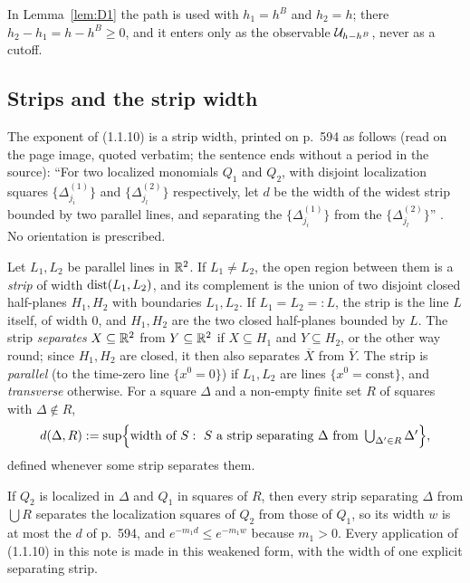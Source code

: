 In Lemma~\ref{lem:D1} the path is used with $h_1=h^B$ and $h_2=h$; there
$h_2-h_1=h-h^B\ge0$, and it enters only as the observable $\mathcal U_{h-h^B}$, never as a cutoff.

\subsection{Strips and the strip width}\label{sec:notation-strips}

The exponent of (1.1.10) is a strip width, printed on p.~594 as follows (read on the page
image, quoted verbatim; the sentence ends without a period in the source): ``For two
localized monomials $Q_1$ and $Q_2$, with disjoint localization squares
$\{\Delta^{(1)}_{j_i}\}$ and $\{\Delta^{(2)}_{j_l}\}$ respectively, let $d$ be the width of
the widest strip bounded by two parallel lines, and separating the $\{\Delta^{(1)}_{j_i}\}$
from the $\{\Delta^{(2)}_{j_l}\}$'' \cite[p.~594]{GJS}.  No orientation is prescribed.

\begin{auxdef}\label{aux:notation-stripdef}
Let $L_1,L_2$ be parallel lines in $\mathbb{R}^2$.  If $L_1\ne L_2$, the open region between them is
a \emph{strip} of width $\operatorname{dist}(L_1,L_2)$, and its complement is the union of two disjoint
closed half-planes $H_1,H_2$ with boundaries $L_1,L_2$.  If $L_1=L_2=:L$, the strip is the
line $L$ itself, of width $0$, and $H_1,H_2$ are the two closed half-planes bounded by $L$.
The strip \emph{separates} $X\subseteq\mathbb{R}^2$ from $Y\subseteq\mathbb{R}^2$ if $X\subseteq H_1$ and
$Y\subseteq H_2$, or the other way round; since $H_1,H_2$ are closed, it then also separates
$\overline X$ from $\overline Y$.  The strip is \emph{parallel} (to the time-zero line
$\{x^0=0\}$) if $L_1,L_2$ are lines $\{x^0=\text{const}\}$, and \emph{transverse}
otherwise.  For a square $\Delta$ and a non-empty finite set $R$ of squares with
$\Delta\notin R$,
\[
 d(\Delta,R):=\sup\Bigl\{\text{width of }S:\ S\text{ a strip separating }\Delta\text{ from }
 \textstyle\bigcup_{\Delta'\in R}\Delta'\Bigr\},
\]
defined whenever some strip separates them.
\end{auxdef}

If $Q_2$ is localized in $\Delta$ and $Q_1$ in squares of $R$, then every strip separating
$\Delta$ from $\bigcup R$ separates the localization squares of $Q_2$ from those of $Q_1$, so
its width $w$ is at most the $d$ of p.~594, and $e^{-m_1d}\le e^{-m_1w}$ because $m_1>0$.
Every application of (1.1.10) in this note is made in this weakened form, with the width of
one explicit separating strip.

